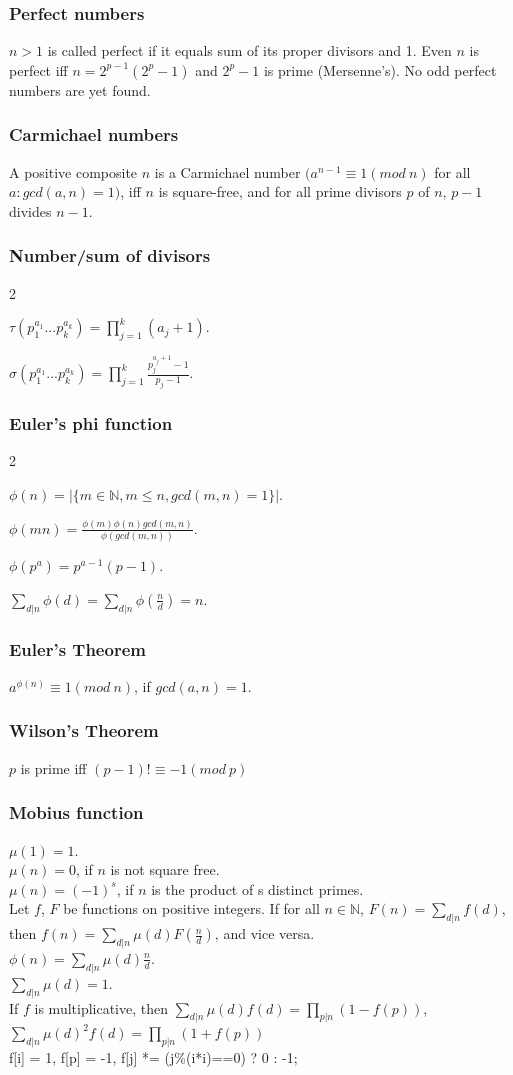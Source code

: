 \documentclass[a4paper,12pt]{article}
\newcommand\includefile[4]{
  \subsubsection{#2}
  \begin{multicols}{2}
    
  \end{multicols}
}
\begin{document}
\subsubsection{Perfect numbers}
$n > 1$ is called perfect if it equals sum of its proper divisors and 1. Even $n$ is perfect iff $n = 2^{p-1}(2^{p} - 1)$ and $2^{p} - 1$ is prime (Mersenne’s). No odd perfect numbers are yet found.

\subsubsection{Carmichael numbers}
A positive composite $n$ is a Carmichael number $(a^{n-1} \equiv 1 (mod\ n)$ for all $a: gcd(a,n) = 1)$, iff $n$ is square-free, and for all prime divisors $p$ of $n$, $p-1$ divides $n-1$.

\newpage
\includefile{c++}{Number/sum of divisors}{meh}{sigma.cpp}

$\tau(p_1^{a_1}...p_k^{a_k}) = \prod_{j=1}^{k}(a_j + 1).$

$\sigma(p_1^{a_1}...p_k^{a_k}) = \prod_{j=1}^{k}\frac{p_{j}^{a_j+1}-1}{p_j-1}.$

\includefile{c++}{Euler's phi function}{meh}{phi.cpp}

$\phi(n) = |\{m \in \mathbb{N}, m \leq n, gcd(m,n) = 1\}|$.

$\phi(mn) = \frac{\phi(m)\phi(n)gcd(m,n)}{\phi(gcd(m,n))}$.

$\phi(p^a) = p^{a-1}(p-1)$.

$\sum_{d|n}\phi(d) = \sum_{d|n}\phi(\frac{n}{d}) = n$.

\subsubsection{Euler's Theorem} 
$a^{\phi(n)} \equiv 1 (mod\ n)$, if $gcd(a,n) = 1$.

\subsubsection{Wilson's Theorem} 
$p$ is prime iff $(p-1)! \equiv -1 (mod\ p)$

\subsubsection{Mobius function}
$\mu(1) = 1$.\\
$\mu(n) = 0$, if $n$ is not square free.\\
$\mu(n) = (-1)^{s}$, if $n$ is the product of s distinct primes.\\
Let $f$, $F$ be functions on positive integers. If for all $n \in \mathbb{N}$, $F(n) = \sum_{d|n}f(d)$, then $f(n) = \sum_{d|n}\mu(d)F(\frac{n}{d})$, and vice versa.\\
$\phi(n) = \sum_{d|n}\mu(d)\frac{n}{d}$.\\
$\sum_{d|n}\mu(d) = 1$.\\
If $f$ is multiplicative, then $\sum_{d|n}\mu(d)f(d) = \prod_{p|n}(1-f(p))$, $\sum_{d|n}\mu(d)^2f(d) = \prod_{p|n}(1+f(p))$\\
f[i] = 1, f[p] = -1, f[j] *= (j\%(i*i)==0) ? 0 : -1;
\end{document}
